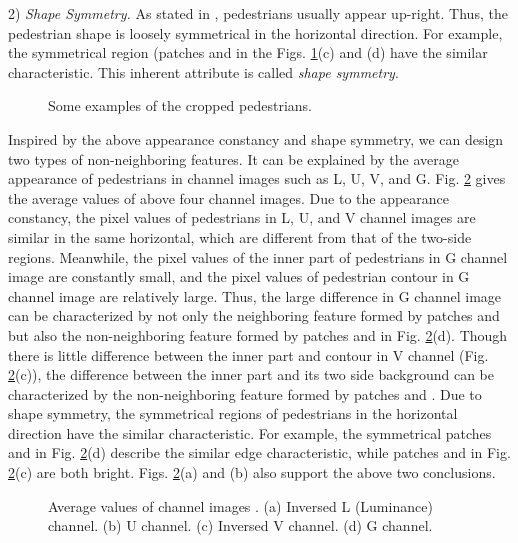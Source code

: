 \documentclass[10pt,twocolumn,letterpaper]{article}
\begin{document}
2) \textit{Shape Symmetry.} As stated in \cite{Zhang_Info.Haar_CVPR_2014}, pedestrians usually appear up-right. Thus, the pedestrian shape is loosely symmetrical in the horizontal direction. For 
example, the symmetrical region (patches  and  in the Figs. \ref{FigSomPed}(c) 
and (d) have the similar characteristic. This inherent attribute is called 
\textit{shape symmetry}.

\begin{figure}[!t]
\centering
{}
\hfil
{}
\hfil
{}
\hfil
{}
\caption{Some examples of the cropped pedestrians.}
\label{FigSomPed}
\end{figure}

Inspired by the above appearance constancy and shape symmetry, we can design 
two types of non-neighboring features. It can be explained by the average 
appearance of pedestrians in channel images such as L, U, V, and G. Fig. \ref{FigAvgPed} 
gives the average values of above four channel images. Due to the appearance constancy, the pixel values of 
pedestrians in L, U, and V channel images are similar in the same horizontal, which are different from that of the two-side regions. Meanwhile, 
the pixel values of the inner part of pedestrians in G channel image are 
constantly small, and the pixel values of pedestrian contour in G channel 
image are relatively large. Thus, the large difference in G channel image 
can be characterized by not only the neighboring feature formed by patches 
 and  but also the non-neighboring feature formed by patches  and 
 in Fig. \ref{FigAvgPed}(d). Though there is little difference between the inner part and contour in V 
channel (Fig. \ref{FigAvgPed}(c)), the difference between the inner part and its two side 
background can be 
characterized by the non-neighboring feature formed by patches 
 and . Due to shape symmetry, the symmetrical regions of pedestrians in the horizontal direction have the similar characteristic. For example, the 
symmetrical patches  and  in Fig. \ref{FigAvgPed}(d) 
describe the similar edge characteristic, while patches 
 and  in Fig. \ref{FigAvgPed}(c) are both bright. Figs. \ref{FigAvgPed}(a) and (b) also support the above two conclusions.

\begin{figure}[!t]
\centering
{}
\hfil
{}
\hfil
{}
\hfil
{}
\caption{Average values of channel images . (a) Inversed L (Luminance) channel. (b) U channel. (c) Inversed V channel. (d) G channel.}
\label{FigAvgPed}
\end{figure}
\end{document}
